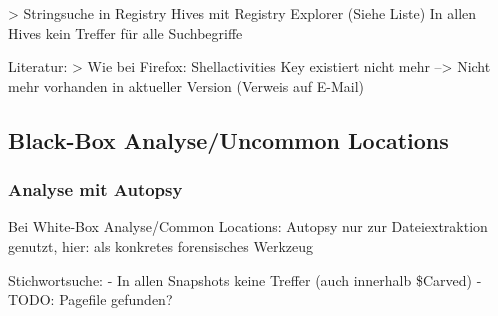 > Stringsuche in Registry Hives mit Registry Explorer (Siehe Liste)
	In allen Hives kein Treffer für alle Suchbegriffe

Literatur: 
	> Wie bei Firefox: Shellactivities Key existiert nicht mehr --> Nicht mehr vorhanden in aktueller Version (Verweis auf E-Mail)


\subsection*{Black-Box Analyse/Uncommon Locations}

\subsubsection*{Analyse mit Autopsy}
Bei White-Box Analyse/Common Locations: Autopsy nur zur Dateiextraktion genutzt, hier: als konkretes forensisches Werkzeug

Stichwortsuche:
- In allen Snapshots keine Treffer (auch innerhalb \$Carved)
- TODO: Pagefile gefunden?

